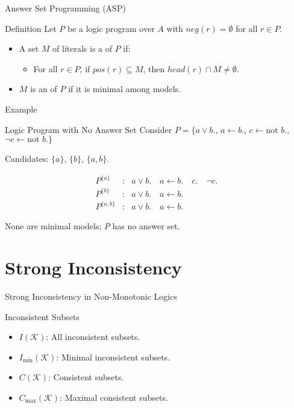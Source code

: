 \begin{frame}{Answer Set Programming (ASP)}
    \begin{block}{Definition}
        Let $P$ be a logic program over $A$ with $neg(r) = \emptyset$ for all $r \in P$.
        \begin{itemize}
            \item A set $M$ of literals is a  of $P$ if:
                  \begin{itemize}
                      \item For all $r \in P$, if $pos(r) \subseteq M$, then $head(r) \cap M \neq \emptyset$.
                  \end{itemize}
            \item $M$ is an  of $P$ if it is minimal among models.
        \end{itemize}
    \end{block}
\end{frame}

\begin{frame}{Example}
    \begin{exampleblock}{Logic Program with No Answer Set}
        Consider $P = \{a \lor b.$, $a \leftarrow b.$, $c \leftarrow \text{not }b.$, $\neg c \leftarrow \text{not }b.\}$

        Candidates: $\{a\}$, $\{b\}$, $\{a, b\}$.

        \[
            \begin{array}{lcl}
                P^{\{a\}}   & : & a \lor b. \quad a \leftarrow b. \quad c. \quad \neg c. \\
                P^{\{b\}}   & : & a \lor b. \quad a \leftarrow b.                        \\
                P^{\{a,b\}} & : & a \lor b. \quad a \leftarrow b.
            \end{array}
        \]

        None are minimal models; $P$ has no answer set.
    \end{exampleblock}
\end{frame}

\section{Strong Inconsistency}

\begin{frame}{Strong Inconsistency in Non-Monotonic Logics}
    \begin{block}{Inconsistent Subsets}
        \begin{itemize}
            \item $I(\mathcal{K})$: All inconsistent subsets.
            \item $I_{\min}(\mathcal{K})$: Minimal inconsistent subsets.
            \item $C(\mathcal{K})$: Consistent subsets.
            \item $C_{\max}(\mathcal{K})$: Maximal consistent subsets.
        \end{itemize}
    \end{block}
\end{frame}

